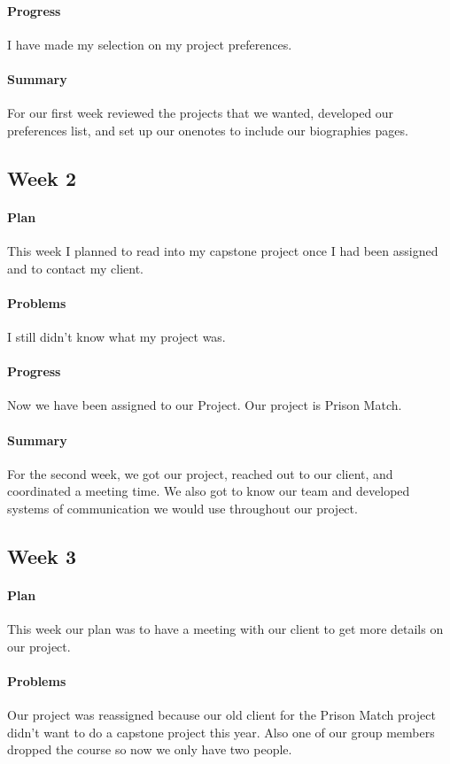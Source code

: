 \documentclass[onecolumn, draftclsnofoot,10pt, compsoc]{IEEEtran}
\begin{document}
\paragraph{Progress}
I have made my selection on my project preferences.
\paragraph{Summary}
For our first week reviewed the projects that we wanted, developed our preferences list, and set up our onenotes to include our biographies pages.

\subsection{Week 2}
\paragraph{Plan}
This week I planned to read into my capstone project once I had been assigned and to contact my client.
\paragraph{Problems}
 I still didn't know what my project was.
\paragraph{Progress}
Now we have been assigned to our Project. Our project is Prison Match.
\paragraph{Summary}
For the second week, we got our project, reached out to our client, and coordinated a meeting time. We also got to know our team and developed systems of communication we would use throughout our project.

\subsection{Week 3}
\paragraph{Plan}
 This week our plan was to have a meeting with our client to get more details on our project.
\paragraph{Problems}
Our project was reassigned because our old client for the Prison Match project didn't want to do a capstone project this year. Also one of our group members dropped the course so now we only have two people.
\end{document}
